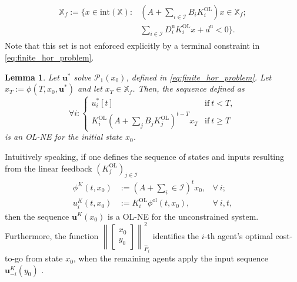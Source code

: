 \documentclass[letterpaper, 10 pt, conference]{ieeeconf}  %
\newcommand{\mc}{\mathcal}
\newcommand{\Kol}{K^{\mathrm{OL}}}
\newcommand{\bu}{\boldsymbol{u}}
\newcommand{\Du}{D^{\text{u}}}
\newcommand{\du}{d^{\text{u}}}
\newcommand{\X}{\mathbb{X}}
\newcommand{\tsum}{\textstyle\sum}
\newtheorem{lemma}[theorem]{Lemma}
\begin{document}
\begin{align} \label{eq:term_set}
\begin{split}
    \X_f:=\{x\in\mathrm{int}(\X): & 
    (A + \tsum_{i\in\mc I} B_i \Kol_i) x\in\X_f; \\
    &\tsum_{i\in \mc I}\Du_i\Kol_i x +\du <0
    \}.
\end{split}  
\end{align}
Note that this set is not enforced explicitly by a terminal constraint in \eqref{eq:finite_hor_problem}.
\begin{lemma}\cite[Theorem 1]{benenati2024linear}
    Let $\bu^*$ solve $\mc P_1(x_0)$, defined in \eqref{eq:finite_hor_problem}. Let $x_T:=\phi(T, x_0, \bu^*)$ and let $x_T\in \mathbb{X}_f$.
    Then, the sequence defined as
    \begin{equation}
        \forall i: \begin{cases}
            u_i^*[t] & \text{if} ~t < T,\\
            \Kol_i (A + \tsum_j B_j\Kol_j)^{t-T} x_T & \text{if} ~t\geq T
        \end{cases}
    \end{equation}
    is an OL-NE for the initial state $x_0$.
\end{lemma}
Intuitively speaking, if one defines the sequence of states and inputs
resulting from the linear feedback $(\Kol_j)_{j\in\mc I}$ 
\begin{align}\label{eq:unconstrained_NE_state_sequence}
    \phi^K(t,x_0)&:= (A + \tsum_i\in\mc I)^t x_0, & \forall ~i;\\
    u_i^K(t, x_0)&:= \Kol_i  \phi^{\text{ol}}(t,x_0), & \forall~i, t,
\end{align}
then the sequence $\bu^K(x_0)$ is a OL-NE for the unconstrained system. Furthermore, the function $\left\| \begin{bmatrix}
    x_0\\ y_0
\end{bmatrix} \right\|^2_{\hat{P}_i}$ identifies the $i$-th agent's optimal cost-to-go from state $x_0$, when the remaining agents apply the input sequence $\bu^K_{-i}(y_0)$ \cite[Lemma 1]{benenati2024linear}. 
\end{document}
